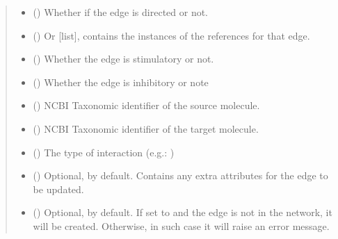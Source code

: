 \documentclass[letterpaper,10pt,english]{sphinxmanual}
\begin{document}
\begin{fulllineitems}
\begin{fulllineitems}
\begin{quote}
\begin{description}
\begin{itemize}
\item {} 
 () \textendash{} Whether if the edge is directed or not.

\item {} 
 () \textendash{} Or {[}list{]}, contains the instances of the references
 for that edge.

\item {} 
 () \textendash{} Whether the edge is stimulatory or not.

\item {} 
 () \textendash{} Whether the edge is inhibitory or note

\item {} 
 () \textendash{} NCBI Taxonomic identifier of the source molecule.

\item {} 
 () \textendash{} NCBI Taxonomic identifier of the target molecule.

\item {} 
 () \textendash{} The type of interaction (e.g.: )

\item {} 
 () \textendash{} Optional, \sphinxcode{\sphinxupquote{\{\}}} by default. Contains any extra attributes
for the edge to be updated.

\item {} 
 () \textendash{} Optional,  by default. If set to  and the
edge is not in the network, it will be created. Otherwise,
in such case it will raise an error message.

\end{itemize}


\end{description}
\end{quote}
\end{fulllineitems}
\end{fulllineitems}
\end{document}
